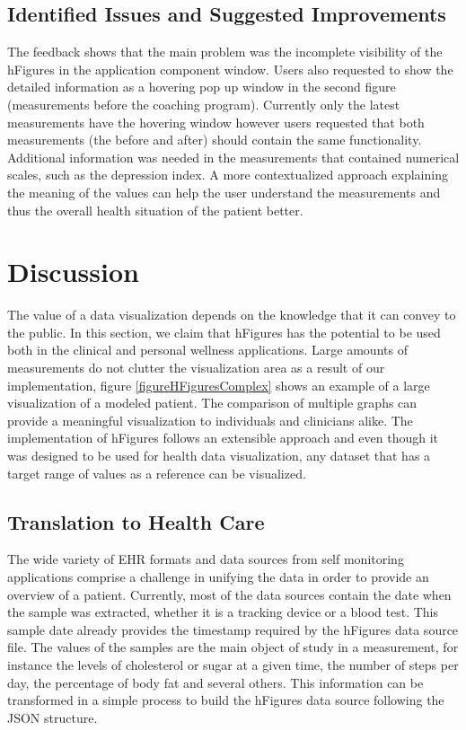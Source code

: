 \documentclass[twocolumn]{bmcart}%
\begin{document}
\subsection*{Identified Issues and Suggested Improvements}

The feedback shows that the main problem was the incomplete visibility of the hFigures in the application component window. Users also requested to show the detailed information as a hovering pop up window in the second figure (measurements before the coaching program). Currently only the latest measurements have the hovering window however users requested that both measurements (the before and after) should contain the same functionality. Additional information was needed in the measurements that contained numerical scales, such as the depression index. A more contextualized approach explaining the meaning of the values can help the user understand the measurements and thus the overall health situation of the patient better.

\section*{Discussion}

The value of a data visualization depends on the knowledge that it can convey to the public. In this section, we claim that hFigures has the potential to be used both in the clinical and personal wellness applications. Large amounts of measurements do not clutter the visualization area as a result of our implementation, figure \ref{figureHFiguresComplex} shows an example of a large visualization of a modeled patient. The comparison of multiple graphs can provide a meaningful visualization to individuals and clinicians alike. The implementation of hFigures follows an extensible approach and even though it was designed to be used for health data visualization, any dataset that has a target range of values as a reference can be visualized.

\subsection*{Translation to Health Care}

The wide variety of EHR formats and data sources from self monitoring applications comprise a challenge in unifying the data in order to provide an overview of a patient. Currently, most of the data sources contain the date when the sample was extracted, whether it is a tracking device or a blood test. This sample date already provides the timestamp required by the hFigures data source file. The values of the samples are the main object of study in a measurement, for instance the levels of cholesterol or sugar at a given time, the number of steps per day, the percentage of body fat and several others. This information can be transformed in a simple process to build the hFigures data source following the JSON structure.
\end{document}
